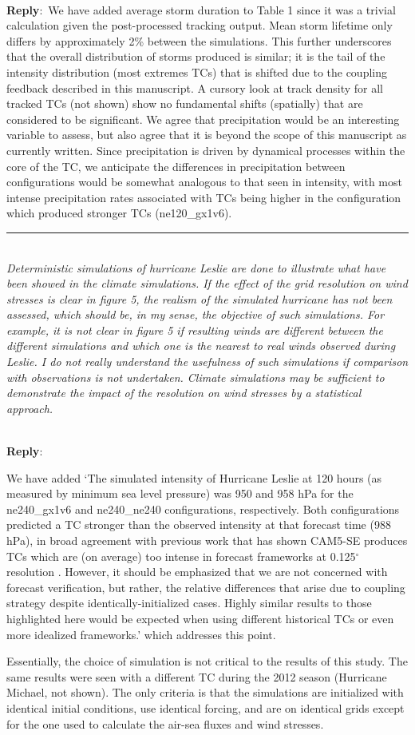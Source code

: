 \documentclass{article}
\newcommand{\genDisc}[1]{\medskip \hrule \noindent \\
               {\itshape #1}}
\newcommand{\reply}{\noindent \\ \textbf{Reply}:\ }
\newcommand{\degree}{$^{\circ}$}
\begin{document}
\reply{We have added average storm duration to Table 1 since it was a trivial calculation given the post-processed tracking output. Mean storm lifetime only differs by approximately 2\% between the simulations. This further underscores that the overall distribution of storms produced is similar; it is the tail of the intensity distribution (most extremes TCs) that is shifted due to the coupling feedback described in this manuscript. A cursory look at track density for all tracked TCs (not shown) show no fundamental shifts (spatially) that are considered to be significant. We agree that precipitation would be an interesting variable to assess, but also agree that it is beyond the scope of this manuscript as currently written. Since precipitation is driven by dynamical processes within the core of the TC, we anticipate the differences in precipitation between configurations would be somewhat analogous to that seen in intensity, with most intense precipitation rates associated with TCs being higher in the configuration which produced stronger TCs (ne120\_gx1v6).}

\genDisc{Deterministic simulations of hurricane Leslie are done to illustrate what have been showed in the climate simulations. If the effect of the grid resolution on wind stresses is clear in figure 5, the realism of the simulated hurricane has not been assessed, which should be, in my sense, the objective of such simulations. For example, it is not clear in figure 5 if resulting winds are different between the different simulations and which one is the nearest to real winds observed during Leslie. I do not really understand the usefulness of such simulations if comparison with observations is not undertaken. Climate simulations may be sufficient to demonstrate the impact of the resolution on wind stresses by a statistical approach.}

\reply{We have added `The simulated intensity of Hurricane Leslie at 120 hours (as measured by minimum sea level pressure) was 950 and 958 hPa for the ne240\_gx1v6 and ne240\_ne240 configurations, respectively. Both configurations predicted a TC stronger than the observed intensity at that forecast time (988 hPa), in broad agreement with previous work that has shown CAM5-SE produces TCs which are (on average) too intense in forecast frameworks at 0.125\degree{} resolution \citep{Zarzycki2015TCForecast}. However, it should be emphasized that we are not concerned with forecast verification, but rather, the relative differences that arise due to coupling strategy despite identically-initialized cases. Highly similar results to those highlighted here would be expected when using different historical TCs or even more idealized frameworks.' which addresses this point.

Essentially, the choice of simulation is not critical to the results of this study. The same results were seen with a different TC during the 2012 season (Hurricane Michael, not shown). The only criteria is that the simulations are initialized with identical initial conditions, use identical forcing, and are on identical grids except for the one used to calculate the air-sea fluxes and wind stresses.}
\end{document}
